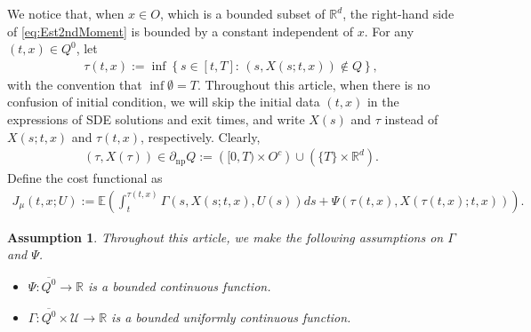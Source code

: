 \documentclass[amscd,amssymb,11pt]{article}
\newtheorem{assumption}[theorem]{Assumption}
\numberwithin{theorem}{section}
\numberwithin{equation}{section}
\begin{document}
We notice that, when $x\in O$, which is a bounded subset of $\mathbb{R}^{d}$, the right-hand side of \eqref{eq:Est2ndMoment} is bounded by a constant independent of $x$. For any $(t,x)\in Q^{0}$, let
\begin{align*}
\tau(t,x):=\inf\left\{s\in[t,T]:\,\left(s,X(s;t,x)\right)\not\in Q\right\},
\end{align*}
with the convention that $\inf\emptyset=T$. Throughout this article, when there is no confusion of initial condition, we will skip the initial data $(t,x)$ in the expressions of SDE solutions and exit times, and write $X(s)$ and $\tau$ instead of $X(s;t,x)$ and $\tau(t,x)$, respectively. Clearly,
\begin{align*}
\left(\tau,X(\tau)\right)\in\partial_{\text{np}}Q:=\left([0,T)\times O^{c}\right)\cup\left(\{T\}\times\mathbb{R}^{d}\right).
\end{align*}
Define the cost functional as
\begin{align}\label{eq:CostFunt}
J_{\mu}\left(t,x;U\right):=\mathbb{E}\left(\int_{t}^{\tau(t,x)}\Gamma\left(s,X(s;t,x),U(s)\right)ds+\Psi\left(\tau(t,x),X(\tau(t,x);t,x)\right)\right).
\end{align}
\begin{assumption}\label{assump:GammaPsi}
Throughout this article, we make the following assumptions on $\Gamma$ and $\Psi$.
\begin{itemize}
\item [(i)] $\Psi:\overline{Q^{0}}\rightarrow\mathbb{R}$ is a bounded continuous function.
\item [(ii)] $\Gamma:\overline{Q^{0}}\times\mathcal{U}\rightarrow\mathbb{R}$ is a bounded uniformly continuous function.
\end{itemize}
\end{assumption}
\end{document}
